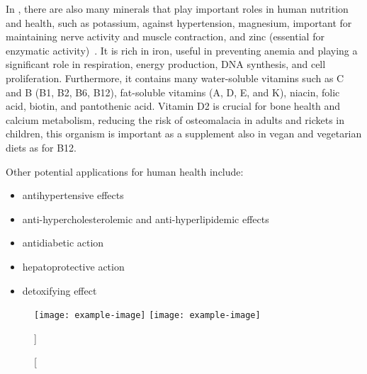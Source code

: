 In , there are also many minerals that play important roles in human nutrition and health, such as potassium, against hypertension, magnesium, important for maintaining nerve activity and muscle contraction, and zinc (essential for enzymatic activity)~\parencite{safi_Morphology_2014}\zariv{}. It is rich in iron, useful in preventing anemia and playing a significant role in respiration, energy production, DNA synthesis, and cell proliferation. Furthermore, it contains many water-soluble vitamins such as C and B (B1, B2, B6, B12), fat-soluble vitamins (A, D, E, and K), niacin, folic acid, biotin, and pantothenic acid. Vitamin D2 is crucial for bone health and calcium metabolism, reducing the risk of osteomalacia in adults and rickets in children, this organism is important as a supplement also in vegan and vegetarian diets as for B12.

Other potential applications for human health include:
\begin{itemize}
\item antihypertensive effects
\item anti-hypercholesterolemic and anti-hyperlipidemic effects
\item antidiabetic action
\item hepatoprotective action
\item detoxifying effect~\parencite{bito_Potential_2020}
\end{itemize}

\begin{figure}[H]
\centering
		{\texttt{[image: example-image]}}%
\hfill
		{\texttt{[image: example-image]}}%
\caption%
[]%
{}
\label{fig:}
\end{figure}


